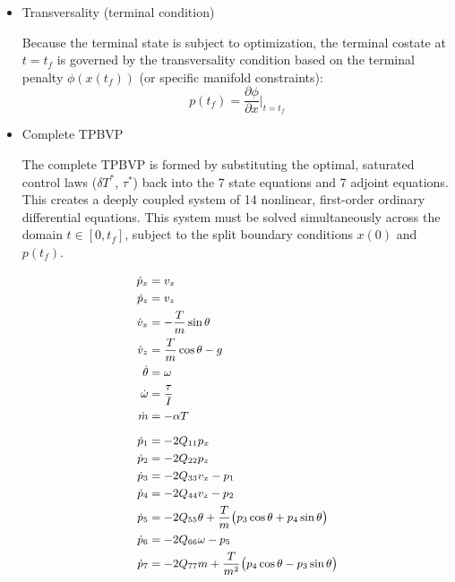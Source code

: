 \documentclass[letterpaper, 10 pt, conference]{ieeeconf}
\begin{document}
\begin{itemize}
\begin{itemize}
        \item For Torque ($\tau$):
        \[\frac{\partial H}{\partial \tau} = 2R_{22}\tau + \frac{p_6}{I} = 0\]
        \[\tau^* = \text{sat}_{\tau_{\min}}^{\tau_{\max}} \left[ -\frac{p_6}{2 I R_{22}} \right]\]
    \end{itemize}

    \item Transversality (terminal condition)
    
    Because the terminal state is subject to optimization, the terminal costate at $t=t_f$ is governed by the transversality condition based on the terminal penalty $\phi(x(t_f))$ (or specific manifold constraints):
    \[p(t_f) = \frac{\partial \phi}{\partial x} \bigg|_{t=t_f}\]

    \item Complete TPBVP
    
    The complete TPBVP is formed by substituting the optimal, saturated control laws ($\delta T^*$, $\tau^*$) back into the 7 state equations and 7 adjoint equations. This creates a deeply coupled system of 14 nonlinear, first-order ordinary differential equations. This system must be solved simultaneously across the domain $t \in [0, t_f]$, subject to the split boundary conditions $x(0)$ and $p(t_f)$.

    \begin{equation} \label{eq:full_tpbvp}
    \small
    \begin{aligned}
        \dot{p}_x &= v_x \\
        \dot{p}_z &= v_z \\
        \dot{v}_x &= -\frac{T}{m}\sin\theta \\
        \dot{v}_z &= \frac{T}{m}\cos\theta - g \\
        \dot{\theta} &= \omega \\
        \dot{\omega} &= \frac{\tau}{I} \\
        \dot{m} &= -\alpha T \\[1.5ex] 
        \dot{p}_1 &= -2Q_{11} p_x \\
        \dot{p}_2 &= -2Q_{22} p_z \\
        \dot{p}_3 &= -2Q_{33} v_x - p_1 \\
        \dot{p}_4 &= -2Q_{44} v_z - p_2 \\
        \dot{p}_5 &= -2Q_{55} \theta + \frac{T}{m} \big(p_3 \cos\theta + p_4 \sin\theta \big) \\
        \dot{p}_6 &= -2Q_{66} \omega - p_5 \\
        \dot{p}_7 &= -2Q_{77} m + \frac{T}{m^2} \big(p_4 \cos\theta - p_3 \sin\theta \big)
    \end{aligned}
    \end{equation}
    
\end{itemize}
\end{document}
